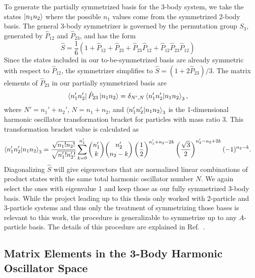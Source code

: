 To generate the partially symmetrized basis for the 3-body system, we take the states $\ket{n_1 n_2}$ where the possible $n_1$ values come from the symmetrized 2-body basis. The general 3-body symmetrizer is governed by the permutation group $S_3$, generated by $\hat{P}_{12}$ and $\hat{P}_{23}$, and has the form
\begin{equation}
\hat{S} = \frac{1}{6}(1 + \hat{P}_{12} + \hat{P}_{23} + \hat{P}_{23}\hat{P}_{12} + \hat{P}_{12}\hat{P}_{23}\hat{P}_{12})
\end{equation}
Since the states included in our to-be-symmetrized basis are already symmetric with respect to $\hat{P}_{12}$, the symmetrizer simplifies to $\hat{S} = (1 + 2\hat{P}_{23})/3$. The matrix elements of $\hat{P}_{23}$ in our partially symmetrized basis are
\begin{equation}
\bra{n_1' n_2'}\hat{P}_{23}\ket{n_1 n_2} = \delta_{N',N} \bra{n_1' n_2'}\ket{n_1 n_2}_3,
\end{equation}
where $N'=n_1' +n_2'$, $N=n_1 + n_2$, and $\bra{n_1' n_2'}\ket{n_1 n_2}_3$ is the 1-dimensional harmonic oscillator transformation bracket for particles with mass ratio 3. This transformation bracket value is calculated as
\begin{equation}
\bra{n_1' n_2'}\ket{n_1 n_2}_3 = \frac{\sqrt{n_1!n_2!}}{\sqrt{n_1'!n_2'!}}\sum_{k=0}^{n_1'}\binom{n_1'}{k}\binom{n_2'}{n_2 - k}\left(\frac{1}{2}\right)^{n_1' + n_2 - 2k}\left(\frac{\sqrt{3}}{2}\right)^{n_2' - n_2 + 2k} (-1)^{n_2-k}.
\end{equation}
Diagonalizing $\hat{S}$ will give eigenvectors that are normalized linear combinations of product states with the same total harmonic oscillator number $N$. We again select the ones with eigenvalue 1 and keep those as our fully symmetrized 3-body basis. While the project leading up to this thesis only worked with 2-particle and 3-particle systems and thus only the treatment of symmetrizing those bases is relevant to this work, the procedure is generalizable to symmetrize up to any $A$-particle basis. The details of this procedure are explained in Ref.~\cite{Jurgenson:2008jp}.

\subsection{Matrix Elements in the 3-Body Harmonic Oscillator Space}

